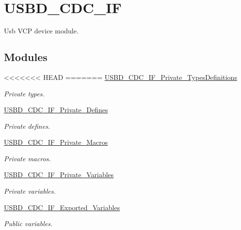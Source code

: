 \hypertarget{group___u_s_b_d___c_d_c___i_f}{}\section{U\+S\+B\+D\+\_\+\+C\+D\+C\+\_\+\+IF}
\label{group___u_s_b_d___c_d_c___i_f}


Usb V\+CP device module.  


\subsection*{Modules}
\begin{DoxyCompactItemize}
\item 
<<<<<<< HEAD
=======
\hyperlink{group___u_s_b_d___c_d_c___i_f___private___types_definitions}{U\+S\+B\+D\+\_\+\+C\+D\+C\+\_\+\+I\+F\+\_\+\+Private\+\_\+\+Types\+Definitions}
\begin{DoxyCompactList}\small\item\em Private types. \end{DoxyCompactList}\item 
\hyperlink{group___u_s_b_d___c_d_c___i_f___private___defines}{U\+S\+B\+D\+\_\+\+C\+D\+C\+\_\+\+I\+F\+\_\+\+Private\+\_\+\+Defines}
\begin{DoxyCompactList}\small\item\em Private defines. \end{DoxyCompactList}\item 
\hyperlink{group___u_s_b_d___c_d_c___i_f___private___macros}{U\+S\+B\+D\+\_\+\+C\+D\+C\+\_\+\+I\+F\+\_\+\+Private\+\_\+\+Macros}
\begin{DoxyCompactList}\small\item\em Private macros. \end{DoxyCompactList}\item 
\hyperlink{group___u_s_b_d___c_d_c___i_f___private___variables}{U\+S\+B\+D\+\_\+\+C\+D\+C\+\_\+\+I\+F\+\_\+\+Private\+\_\+\+Variables}
\begin{DoxyCompactList}\small\item\em Private variables. \end{DoxyCompactList}\item 
\hyperlink{group___u_s_b_d___c_d_c___i_f___exported___variables}{U\+S\+B\+D\+\_\+\+C\+D\+C\+\_\+\+I\+F\+\_\+\+Exported\+\_\+\+Variables}
\begin{DoxyCompactList}\small\item\em Public variables. \end{DoxyCompactList}\item 

\end{DoxyCompactItemize}
